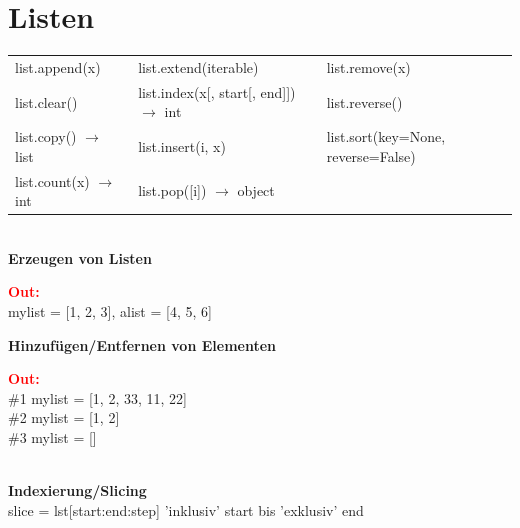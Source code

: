 \section*{Listen}
	\hspace{2cm}
	\begin{tabular}{|l l l|}
		\hline list.append(x) & list.extend(iterable) & list.remove(x)
		\\ list.clear() & list.index(x[, start[, end]]) $\to$ int & list.reverse()
		\\ list.copy() $\to$ list & list.insert(i, x) & list.sort(key=None, reverse=False)
		\\ list.count(x) $\to$ int & list.pop([i]) $\to$ object & 
		\\\hline
	\end{tabular}
	\vspace{0.5cm}
	\\\vspace{0.1cm}
	\textbf{Erzeugen von Listen}
	\\
	\begin{minipage}[h]{10cm}
		
	\end{minipage}
	\begin{minipage}[h]{8cm}
		\textcolor{red}{\textbf{Out:}} \\
		mylist = [1, 2, 3], alist = [4, 5, 6]
	\end{minipage}
	\newpage
	\hspace{-0.5cm}
	\textbf{Hinzufügen/Entfernen von Elementen}
	\\
	\begin{minipage}[h]{10cm}
		
	\end{minipage}
	\begin{minipage}[h]{8cm}
		\textcolor{red}{\textbf{Out:}}
		\\\#1 mylist = [1, 2, 33, 11, 22]
		\\\#2 mylist = [1, 2]
		\\\#3 mylist = []
	\end{minipage}
	\vspace{0.5cm}
	\\\textbf{Indexierung/Slicing}\\
	slice = lst[start:end:step]
	'inklusiv' start bis 'exklusiv' end\\
